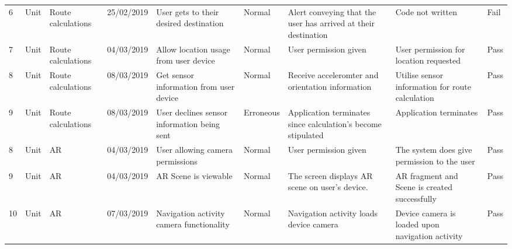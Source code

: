 \begin{adjustbox}{angle=90}
\begin{tabular}{l|l|l|l|p{3cm}|l|p{3cm}|p{3cm}|l}
6       & Unit                          & Route calculations & 25/02/2019     & User gets to their desired destination                                        & Normal    & Alert conveying that the user has arrived at their destination               & Code not written                                                            & Fail        \\
7       & Unit                          & Route calculations & 04/03/2019     & Allow location usage from user device                                         & Normal    & User permission given                                                        & User permission for location requested                                      & Pass        \\
8       & Unit                          & Route calculations & 08/03/2019     & Get sensor information from user device                                       & Normal    & Receive acceleromter and orientation information                             & Utilise sensor information for route calculation                            & Pass        \\
9       & Unit                          & Route calculations & 08/03/2019     & User declines sensor information being sent                                   & Erroneous & Application terminates since calculation's become stipulated                 & Application terminates                                                      & Pass        \\
8       & Unit                          & AR                 & 04/03/2019     & User allowing camera permissions                                              & Normal    & User permission given                                                        & The system does give permission to the user                                 & Pass        \\
9       & Unit                          & AR                 & 04/03/2019     & AR Scene is viewable                                                          & Normal    & The screen displays AR scene on user's device.                               & AR fragment and Scene is created successfully                               & Pass        \\
10      & Unit                          & AR                 & 07/03/2019     & Navigation activity camera functionality                                      & Normal    & Navigation activity loads device camera                                      & Device camera is loaded upon navigation activity                            & Pass        \\

\end{tabular}
\end{adjustbox}

